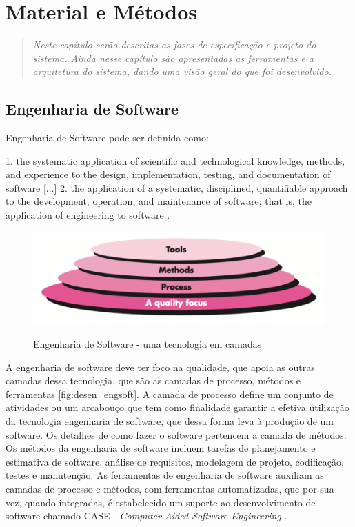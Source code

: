 \chapter{Material e Métodos}
\begin{quote}\normalfont\itshape\vspace*{-2\baselineskip}
Neste capítulo serão descritas as fases de especificação e projeto do sistema. Ainda nesse capítulo são apresentadas as ferramentas e a arquitetura do sistema, dando uma visão geral do que foi desenvolvido.
\end{quote}

\section{Engenharia de Software}

Engenharia de Software pode ser definida como:
\begin{citacao}[english]
1. the systematic application of scientific and technological knowledge, methods, and experience to the design,
implementation, testing, and documentation of software [...]  2. the application
of a systematic, disciplined, quantifiable approach to the development, operation,
and maintenance of software; that is, the application of engineering to software \cite{IEEE2010}.
\end{citacao}

\begin{figure}[!b]
  \centering
  \caption{Engenharia de Software - uma tecnologia em camadas}
  \includegraphics[scale=0.33]{imagens/desenv_engsoft2}
  \label{fig:desen_engsoft}
\end{figure}

A engenharia de software deve ter foco na qualidade, que apoia as outras camadas
dessa tecnologia, que são as camadas de processo, métodos e ferramentas \autoref{fig:desen_engsoft}.
A camada de processo define um conjunto de atividades ou um arcabouço que tem
como finalidade garantir a efetiva utilização da tecnologia engenharia de software, que dessa forma
leva à produção de um software. Os detalhes de como fazer o software pertencem
a camada de métodos. Os métodos da engenharia de software incluem tarefas de planejamento
e estimativa de software, análise de requisitos, modelagem de projeto, codificação,
testes e manutenção. As ferramentas de engenharia de software auxiliam as camadas de
processo e métodos, com ferramentas automatizadas, que por sua vez, quando integradas,
é estabelecido um suporte ao desenvolvimento de software chamado CASE -
\textit{Computer Aided Software Engineering} \cite{Pressman2009, Sommerville2006}.

